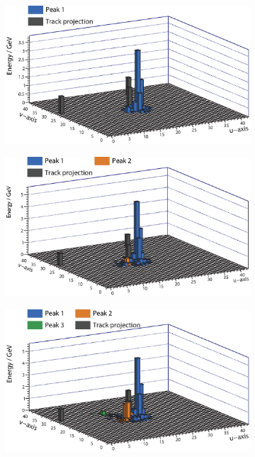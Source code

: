 \begin{figure}[tbph]
\centering
  \begin{subfigure}[b]{0.65\textwidth}
    \includegraphics[width=\textwidth]{photon/2Dpeak/charge1}
    \caption{}
    \label{fig:photon2DpeakCharge1}
  \end{subfigure}
  \begin{subfigure}[b]{0.65\textwidth}
    \includegraphics[width=\textwidth]{photon/2Dpeak/charge2}
    \caption{}
    \label{fig:photon2DpeakCharge2}
  \end{subfigure}
  \begin{subfigure}[b]{0.65\textwidth}
    \includegraphics[width=\textwidth]{photon/2Dpeak/charge3}

\end{subfigure}
\end{figure}
